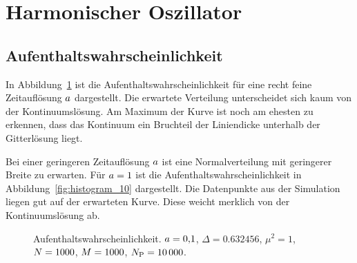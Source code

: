 \section{Harmonischer Oszillator}

\subsection{Aufenthaltswahrscheinlichkeit}


In Abbildung~\ref{fig:histogram_01} ist die Aufenthaltswahrscheinlichkeit für
eine recht feine Zeitauflösung $a$ dargestellt. Die erwartete
Verteilung unterscheidet sich kaum von der Kontinuumslösung. Am Maximum der
Kurve ist noch am ehesten zu erkennen, dass das Kontinuum ein Bruchteil der
Liniendicke unterhalb der Gitterlösung liegt.

Bei einer geringeren Zeitauflösung $a$ ist eine Normalverteilung mit
geringerer Breite zu erwarten. Für $a = \num{1}$ ist die
Aufenthaltswahrscheinlichkeit in Abbildung~\ref{fig:histogram_10} dargestellt.
Die Datenpunkte aus der Simulation liegen gut auf der erwarteten Kurve. Diese
weicht merklich von der Kontinuumslösung ab.

\begin{figure}[htbp]
    \centering
    \caption{%
        Aufenthaltswahrscheinlichkeit. $a =
        \num{0.1}$, $\Delta = \num{0.632456}$, $\mu^2 = \num{1}$, $N =
        \num{1000}$, $M = \num{1000}$, $N_\text P = \num{10000}$.
    }
    \label{fig:histogram_01}
\end{figure}

